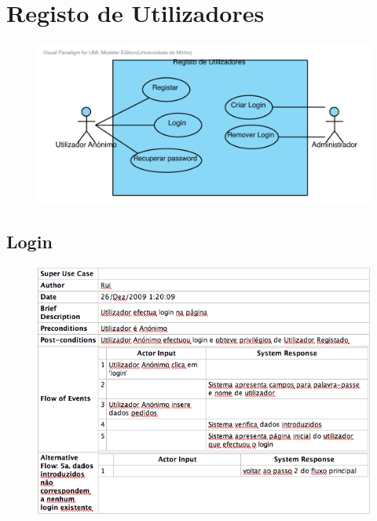 \pagebreak


\section{Registo de Utilizadores}
\begin{figure}[!htb]
	\centering
	\includegraphics[scale=0.63]{images/Prints/RegistoUtilizadores/RegistoUtilizadores.pdf}
\end{figure}

\subsection{Login}
\begin{figure}[!htb]
	\centering
	\includegraphics[scale=0.63]{images/Prints/RegistoUtilizadores/Login.png}
\end{figure}

\pagebreak


